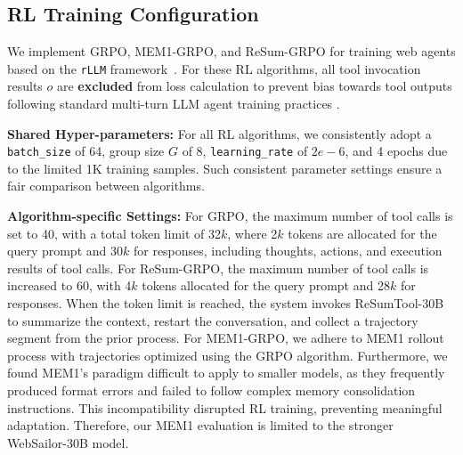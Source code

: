\subsection{RL Training Configuration}\label{appendix:rl_training}

We implement GRPO, MEM1-GRPO, and ReSum-GRPO for training web agents based on the \texttt{rLLM} framework~\citep{rllm2025}. For these RL algorithms, all tool invocation results $o$ are \textbf{excluded} from loss calculation to prevent bias towards tool outputs following standard multi-turn LLM agent training practices \cite{jin2025search,dong2025arpo}.

\textbf{Shared Hyper-parameters:} For all RL algorithms, we consistently adopt a \texttt{batch\_size} of 64, group size $G$ of 8, \texttt{learning\_rate} of $2e-6$, and 4 epochs due to the limited 1K training samples. Such consistent parameter settings ensure a fair comparison between algorithms.

\textbf{Algorithm-specific Settings:} For GRPO, the maximum number of tool calls is set to 40, with a total token limit of 32$k$, where 2$k$ tokens are allocated for the query prompt and 30$k$ for responses, including thoughts, actions, and execution results of tool calls. For ReSum-GRPO, the maximum number of tool calls is increased to 60, with 4$k$ tokens allocated for the query prompt and 28$k$ for responses. When the token limit is reached, the system invokes ReSumTool-30B to summarize the context, restart the conversation, and collect a trajectory segment from the prior process. For MEM1-GRPO, we adhere to MEM1 rollout process with trajectories optimized using the GRPO algorithm. Furthermore, we found MEM1's paradigm difficult to apply to smaller models, as they frequently produced format errors and failed to follow complex memory consolidation instructions. This incompatibility disrupted RL training, preventing meaningful adaptation. Therefore, our MEM1 evaluation is limited to the stronger WebSailor-30B model. 
